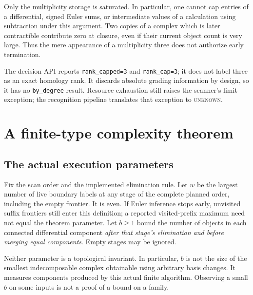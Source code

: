 \documentclass[11pt,letterpaper]{article}
\newcommand{\code}[1]{\texttt{#1}}
\newcommand{\UNKNOWN}{\textup{\textsc{unknown}}}
\begin{document}
Only the multiplicity storage is saturated. In particular, one cannot cap
entries of a differential, signed Euler sums, or intermediate values of a
calculation using subtraction under this argument. Two copies of a complex
which is later contractible contribute zero at closure, even if their
current object count is very large. Thus the mere appearance of a
multiplicity three does not authorize early termination.

The decision API reports \code{rank\_capped=3} and \code{rank\_cap=3}; it
does not label three as an exact homology rank. It discards absolute grading
information by design, so it has no \code{by\_degree} result. Resource
exhaustion still raises the scanner's limit exception; the recognition
pipeline translates that exception to \UNKNOWN.

\section{A finite-type complexity theorem}
\label{sec:complexity}

\subsection{The actual execution parameters}
Fix the scan order and the implemented elimination rule. Let $w$ be the
largest number of live boundary labels at any stage of the complete planned
order, including the empty frontier. It is even. If Euler inference stops
early, unvisited suffix frontiers still enter this definition; a reported
visited-prefix maximum need not equal the theorem parameter. Let $b\ge1$ bound the number of objects in each
connected differential component \emph{after that stage's elimination and
before merging equal components}. Empty stages may be ignored.

Neither parameter is a topological invariant. In particular, $b$ is not the
size of the smallest indecomposable complex obtainable using arbitrary
basis changes. It measures components produced by this actual finite
algorithm. Observing a small $b$ on some inputs is not a proof of a bound
on a family.
\end{document}
